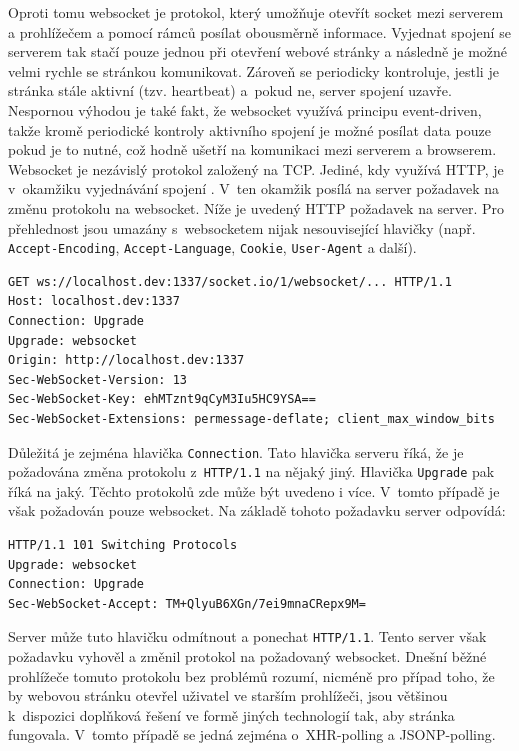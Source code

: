 Oproti tomu websocket \cite{rfc6455} je protokol, který umožňuje otevřít socket mezi serverem a prohlížečem a pomocí rámců posílat obousměrně informace. Vyjednat spojení se serverem tak stačí pouze jednou při otevření webové stránky a následně je možné velmi rychle se stránkou komunikovat. Zároveň se periodicky kontroluje, jestli je stránka stále aktivní (tzv. heartbeat) a~pokud ne, server spojení uzavře. Nespornou výhodou je také fakt, že websocket využívá principu event-driven, takže kromě periodické kontroly aktivního spojení je možné posílat data pouze pokud je to nutné, což hodně ušetří na komunikaci mezi serverem a browserem. Websocket  je nezávislý protokol založený na TCP. Jediné, kdy využívá HTTP,  je v~okamžiku vyjednávání spojení \cite{rfc6455}. V~ten okamžik posílá na server požadavek na změnu protokolu na websocket. Níže je uvedený HTTP požadavek na server. Pro přehlednost jsou umazány s~websocketem nijak nesouvisející hlavičky (např. \texttt{Accept-Encoding}, \texttt{Accept-Language}, \texttt{Cookie}, \texttt{User-Agent} a další).

\begin{verbatim}
GET ws://localhost.dev:1337/socket.io/1/websocket/... HTTP/1.1
Host: localhost.dev:1337
Connection: Upgrade
Upgrade: websocket
Origin: http://localhost.dev:1337
Sec-WebSocket-Version: 13
Sec-WebSocket-Key: ehMTznt9qCyM3Iu5HC9YSA==
Sec-WebSocket-Extensions: permessage-deflate; client_max_window_bits
\end{verbatim}

Důležitá je zejména hlavička \texttt{Connection}. Tato hlavička serveru říká, že je požadována změna protokolu z~\texttt{HTTP/1.1} na nějaký jiný. Hlavička \texttt{Upgrade} pak říká na jaký. Těchto protokolů zde může být uvedeno i více. V~tomto případě je však požadován pouze websocket. Na základě tohoto požadavku server odpovídá:

\begin{verbatim}
HTTP/1.1 101 Switching Protocols
Upgrade: websocket
Connection: Upgrade
Sec-WebSocket-Accept: TM+QlyuB6XGn/7ei9mnaCRepx9M=
\end{verbatim}

Server může tuto hlavičku odmítnout a ponechat \texttt{HTTP/1.1}. Tento server však požadavku vyhověl a změnil protokol na požadovaný websocket. Dnešní běžné prohlížeče tomuto protokolu bez problémů rozumí, nicméně pro případ toho, že by webovou stránku otevřel uživatel ve starším prohlížeči, jsou většinou k~dispozici doplňková řešení ve formě jiných technologií tak, aby stránka fungovala. V~tomto případě se jedná zejména o~XHR-polling a JSONP-polling.

